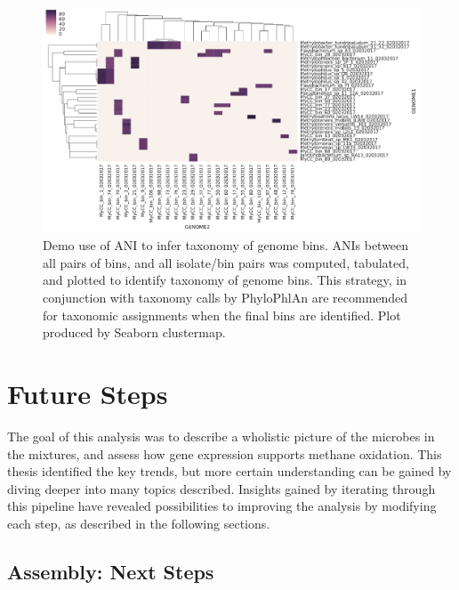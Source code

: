 \begin{figure}[H]
\centering
    \includegraphics[width=1.0\textwidth]{./tex/chapter2/figures/170203_demo_of_ANI_heatmap.pdf}
    \begin{singlespace}
    \caption[Demo use of ANI to infer taxonomy of genome bins]{
        Demo use of ANI to infer taxonomy of genome bins.
        ANIs between all pairs of bins, and all isolate/bin pairs was computed, tabulated, and plotted to identify taxonomy of genome bins.
        This strategy, in conjunction with taxonomy calls by PhyloPhlAn \cite{segata2013} are recommended for taxonomic assignments when the final bins are identified.
        Plot produced by Seaborn clustermap.}
    \label{fig:ANIs}
    \end{singlespace}
\end{figure}

\section{Future Steps}
\label{chA_future_steps}


The goal of this analysis was to describe a wholistic picture of the microbes in the mixtures, and assess how gene expression supports methane oxidation.
This thesis identified the key trends, but more certain understanding can be gained by diving deeper into many topics described.
Insights gained by iterating through this pipeline have revealed possibilities to improving the analysis by modifying each step, as described in the following sections.

\subsection{Assembly: Next Steps}


